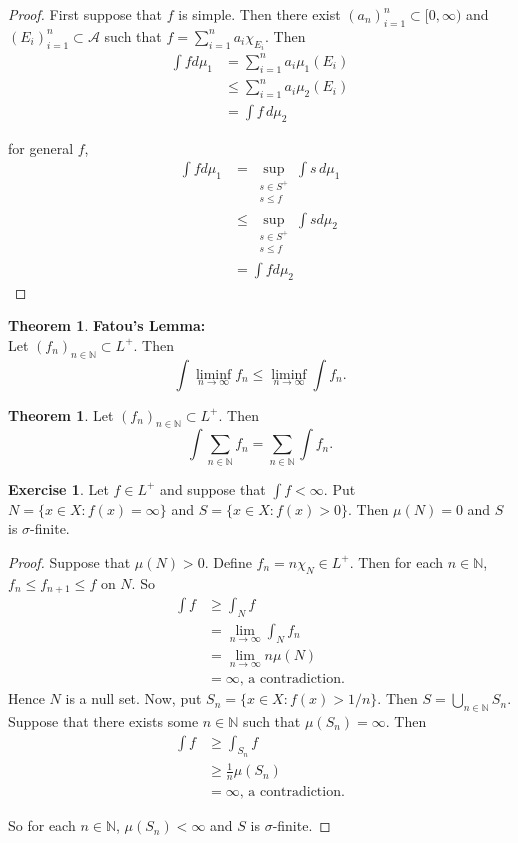 \documentclass[12pt]{amsart}
\theoremstyle{definition}
\newtheorem{thm}[definition]{Theorem}
\newtheorem{ex}[definition]{Exercise}
\newcommand{\sig}{\sigma}
\newcommand{\N}{\mathbb{N}}
\newcommand{\MA}{\mathcal{A}}
\newcommand{\dmu}{\, d \mu}
\newcommand{\Rg}{[0,\infty)}
\newcommand{\limfn}{\liminf \limits_{n \rightarrow \infty}}
\newcommand{\lex}[1]{\label{ex:#1}}
\begin{document}
	\begin{proof}
		First suppose that $f$ is simple. Then there exist $(a_n)_{i=1}^n \subset \Rg$ and $(E_i)_{i=1}^n \subset \MA$ such that $f = \sum\limits_{i =1}^n a_i \chi_{E_i}$. Then 
		\begin{align*}
			\int f d\mu_1 
			&= \sum\limits_{i =1}^n a_i \mu_1(E_i)\\
			& \leq \sum\limits_{i =1}^n a_i \mu_2(E_i)\\
			&= \int f \dmu_2
		\end{align*} 
		
		for general $f$, 
		\begin{align*}
			\int f d\mu_1 
			&= \sup_{\substack{s \in S^+\\s \leq f}} \int s \dmu_1 \\
			& \leq \sup_{\substack{s \in S^+\\s \leq f}} \int s d\mu_2\\
			&= \int f d\mu_2
		\end{align*}
		
	\end{proof}
	
	\begin{thm} \textbf{Fatou's Lemma:}\\
		Let $(f_n)_{n \in \N} \subset L^+$. Then $$\int \limfn f_n \leq \limfn \int f_n.$$
	\end{thm}
	
	\begin{thm}
		Let $(f_n)_{n \in \N} \subset L^+$. Then $$\int \sum_{n \in \N} f_n= \sum_{n \in \N} \int f_n.$$
	\end{thm}
	
	\begin{ex} \lex{00000} 
		Let $f \in L^+$ and suppose that $\int f < \infty$. Put $N = \{x \in X: f(x) = \infty\}$ and $S = \{x \in X: f(x) > 0\}$. Then $\mu(N) = 0$ and $S$ is $\sig$-finite.
	\end{ex}
	
	\begin{proof}
		Suppose that $\mu(N) > 0$. Define $f_n = n \chi_{N} \in L^+$. Then for each $n \in \N$, $f_n \leq f_{n+1} \leq f$ on $N$. So 
		\begin{align*}
			\int f 
			&\geq \int_N f\\ 
			&= \lim\limits_{n \rightarrow \infty} \int_N f_n\\ 
			&= \lim\limits_{n \rightarrow \infty} n\mu(N)\\
			&= \infty \text{, a contradiction.}
		\end{align*}
		Hence $N$ is a null set. Now, put $S_n = \{x \in X: f(x)>1/n\}$. Then $S = \bigcup \limits_{n \in \N}S_n$. Suppose that there exists some $n \in \N$ such that $\mu(S_n) = \infty$. Then 
		\begin{align*}
			\int f 
			&\geq \int_{S_n} f \\
			&\geq \frac{1}{n}\mu(S_n) \\
			&= \infty \text{, a contradiction.}
		\end{align*}
		
		So for each $n \in \N$, $\mu(S_n) < \infty$ and $S$ is $\sig$-finite.
		
	\end{proof}
	
\end{document}
